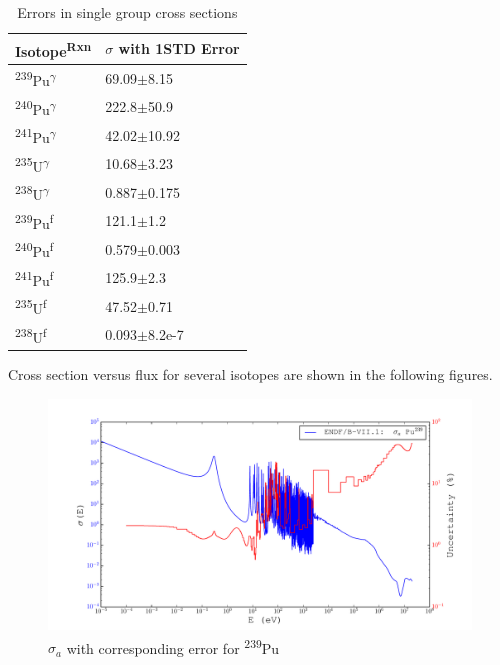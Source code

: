 \documentclass[11pt,notitlepage]{article}
\newcommand{\tss}{\textsuperscript}
\begin{document}
\begin{todolist}
  \begin{table}[H]
  \begin{center}
    \caption{Errors in single group cross sections}
    \label{Table:4}
    \begin{tabular}{l l}
      \toprule
      Isotope\tss{Rxn} & $\sigma$ with 1STD Error\\
      \hline
      \tss{239}Pu\tss{$\gamma$} & 69.09$\pm$8.15\\
      \tss{240}Pu\tss{$\gamma$} & 222.8$\pm$50.9\\
      \tss{241}Pu\tss{$\gamma$} & 42.02$\pm$10.92\\
      \tss{235}U\tss{$\gamma$}  & 10.68$\pm$3.23\\
      \tss{238}U\tss{$\gamma$}  & 0.887$\pm$0.175\\
      \tss{239}Pu\tss{f} & 121.1$\pm$1.2 \\
      \tss{240}Pu\tss{f} & 0.579$\pm$0.003 \\
      \tss{241}Pu\tss{f} & 125.9$\pm$2.3 \\
      \tss{235}U\tss{f}  & 47.52$\pm$0.71 \\
      \tss{238}U\tss{f}  & 0.093$\pm$8.2e-7 \\
      \bottomrule
    \end{tabular}
  \end{center}
  \end{table}


  
  Cross section versus flux for several isotopes are shown in the
  following figures.

  \begin{figure}[H]
    \begin{center}
      \includegraphics[width=0.77\columnwidth]{../Weighting/X_Sections/XwVar_Pu_239_94_a.pdf}
      \vspace{-5mm}
      \caption{$\sigma_a$ with corresponding error for \tss{239}Pu}
      \label{fig:XPu239}
    \end{center}
  \end{figure}


\end{todolist}
\end{document}
